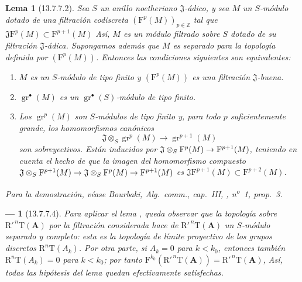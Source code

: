 \documentclass[10pt,oneside,openany]{book}
\theoremstyle{egaenv}\newtheorem*{env}{---}
\theoremstyle{egastatement}
\newtheorem*{lemma}{Lema}
\theoremstyle{egadescription}
\newcommand{\oldpage}[2][]{\marginnote{\normalfont\scriptsize\textbf{#1}\,|\,#2}\ignorespaces}
\renewcommand{\to}{\mathchoice{\longrightarrow}{\rightarrow}{\rightarrow}{\rightarrow}}
\begin{document}
\begin{lemma}[13.7.7.2]
\label{0.13.7.7.2}
\label{0.13.7.7.2-fr}
Sea $S$ un anillo noetheriano $\mathfrak J$-ádico, y sea $M$
un $S$-módulo dotado de una filtración codiscreta
$(\mathrm F^p(M))_{p\in\mathbb Z}$ tal que
$\mathfrak J\mathrm F^p(M)\subset\mathrm F^{p+1}(M)$
Así, $M$ es un módulo filtrado sobre $S$ dotado de su
filtración $\mathfrak J$-ádica.
Supongamos además que $M$ es separado para la topología definida por
$(\mathrm F^p(M))$.
Entonces las condiciones siguientes son equivalentes:
\begin{enumerate}
  \item[{\rm a)}] $M$ es un $S$-módulo de tipo finito y
  $(\mathrm F^p(M))$ es una filtración $\mathfrak J$-buena.
  \item[{\rm b)}] $\operatorname{gr}^\bullet(M)$ es un
  $\operatorname{gr}^\bullet(S)$-módulo de tipo finito.
  \item[{\rm c)}] Los $\operatorname{gr}^p(M)$ son $S$-módulos de
  tipo finito y, para todo $p$ suficientemente grande, los homomorfismos
  canónicos
  \begin{equation}
\label{0.13.7.7.3-fr}
\tag{13.7.7.3}
\mathfrak J\otimes_S\operatorname{gr}^p(M)\longrightarrow
\operatorname{gr}^{p+1}(M)
\end{equation}
  \oldpage[0\textsubscript{III}]{79}
  son sobreyectivos.
  Están inducidos por
  $\mathfrak J\otimes_S\mathrm F^p(M)\to\mathrm F^{p+1}(M)$, teniendo en cuenta el hecho
  de que la imagen del homomorfismo compuesto
  $\mathfrak J\otimes_S\mathrm F^{p+1}(M)\to
\mathfrak J\otimes_S\mathrm F^p(M)\to\mathrm F^{p+1}(M)$
  es
  $\mathfrak J\mathrm F^{p+1}(M)\subset\mathrm F^{p+2}(M)$.
\end{enumerate}

\textup{Para la demostración, véase Bourbaki, \emph{Alg.\ comm.}, cap.~III,
, n\textsuperscript{o}~1, prop.~3.}
\end{lemma}

\begin{env}[13.7.7.4]
\label{0.13.7.7.4}
\label{0.13.7.7.4-fr}
Para aplicar el lema , queda observar que la
topología sobre $\mathrm R'^{\,n}\mathrm T(\mathbf A)$ por la filtración considerada hace de $\mathrm R'^{\,n}\mathrm T(\mathbf A)$ un $S$-módulo separado y completo:
esta es la topología de límite proyectivo de los grupos discretos
$\mathrm R^n\mathrm T(A_k)$.
Por otra parte, si $A_k=0$ para $k<k_0$, entonces también
$\mathrm R^n\mathrm T(A_k)=0$ para $k<k_0$; por tanto
$\mathrm F^{k_0}(\mathrm R'^{\,n}\mathrm T(\mathbf A))=
\mathrm R'^{\,n}\mathrm T(\mathbf A)$,
Así, todas las hipótesis del lema quedan efectivamente satisfechas.
\end{env}
\end{document}
